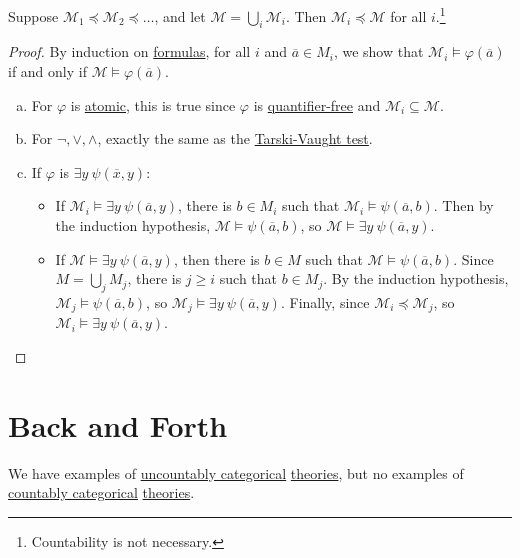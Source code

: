 \begin{proposition}
	Suppose \(\mathcal{M} _1 \preceq \mathcal{M} _2 \preceq \ldots \), and let \(\mathcal{M} = \bigcup_{i} \mathcal{M} _i\). Then \(\mathcal{M} _i \preceq \mathcal{M} \) for all \(i\).\footnote{Countability is not necessary.}
\end{proposition}
\begin{proof}
	By induction on \hyperref[def:formula]{formulas}, for all \(i\) and \(\overline{a} \in M_i\), we show that \(\mathcal{M} _i \models \varphi (\overline{a} )\) if and only if \(\mathcal{M} \models \varphi (\overline{a} )\).
	\begin{enumerate}[(a)]
		\item For \(\varphi \) is \hyperref[not:atomic]{atomic}, this is true since \(\varphi \) is \hyperref[not:quantifier-free]{quantifier-free} and \(\mathcal{M} _i \subseteq \mathcal{M} \).
		\item For \(\lnot, \lor, \land \), exactly the same as the \hyperref[prop:Tarski-Vaught-test]{Tarski-Vaught test}.
		\item If \(\varphi \) is \(\exists y\ \psi (\overline{x} , y)\):
		      \begin{itemize}
			      \item If \(\mathcal{M} _i \models \exists y\ \psi (\overline{a} , y)\), there is \(b\in M_i\) such that \(\mathcal{M} _i \models \psi (\overline{a} , b)\). Then by the induction hypothesis, \(\mathcal{M} \models \psi (\overline{a} , b)\), so \(\mathcal{M} \models \exists y\ \psi (\overline{a} , y)\).
			      \item If \(\mathcal{M} \models \exists y\ \psi (\overline{a} , y)\), then there is \(b\in M\) such that \(\mathcal{M} \models \psi (\overline{a} , b)\). Since \(M = \bigcup_{j} M_j\), there is \(j \geq i\) such that \(b\in M_j\). By the induction hypothesis, \(\mathcal{M} _j \models \psi (\overline{a} , b)\), so \(\mathcal{M} _j \models \exists y\ \psi (\overline{a} , y)\). Finally, since \(\mathcal{M} _i \preceq \mathcal{M} _j\), so \(\mathcal{M} _i \models \exists y\ \psi (\overline{a} , y)\).
		      \end{itemize}
	\end{enumerate}
\end{proof}

\section{Back and Forth}
We have examples of \hyperref[def:uncountably-categorical]{uncountably categorical} \hyperref[def:theory]{theories}, but no examples of \hyperref[def:countably-categorical]{countably categorical} \hyperref[def:theory]{theories}.

